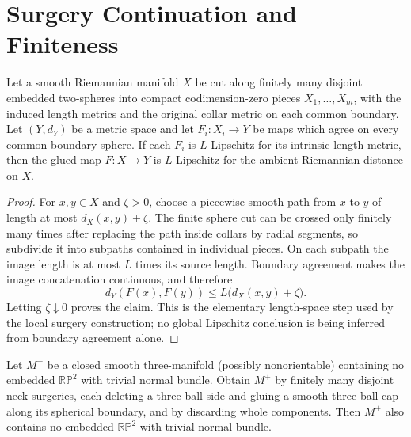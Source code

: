 \section{Surgery Continuation and Finiteness}

\begin{lemma}
\label{lem:length-metric-gluing}
\notready
Let a smooth Riemannian manifold $X$ be cut along finitely many disjoint
embedded two-spheres into compact codimension-zero pieces $X_1,\ldots,X_m$,
with the induced length metrics and the original collar metric on each common
boundary.  Let $(Y,d_Y)$ be a metric space and let
$F_i\colon X_i\to Y$ be maps which agree on every common boundary sphere.
If each $F_i$ is $L$-Lipschitz for its intrinsic length metric, then the
glued map $F\colon X\to Y$ is $L$-Lipschitz for the ambient Riemannian
distance on $X$.
\end{lemma}

\begin{proof}
For $x,y\in X$ and $\zeta>0$, choose a piecewise smooth path from $x$ to
$y$ of length at most $d_X(x,y)+\zeta$.  The finite sphere cut can be
crossed only finitely many times after replacing the path inside collars by
radial segments, so subdivide it into subpaths contained in individual
pieces.  On each subpath the image length is at most $L$ times its source
length.  Boundary agreement makes the image concatenation continuous, and
therefore
\[
 d_Y(F(x),F(y))\le L\bigl(d_X(x,y)+\zeta\bigr).
\]
Letting $\zeta\downarrow0$ proves the claim.  This is the elementary
length-space step used by the local surgery construction; no global
Lipschitz conclusion is being inferred from boundary agreement alone.
\end{proof}

\begin{lemma}
\label{lem:rp2-exclusion-under-ball-surgery}
\notready
Let $M^-$ be a closed smooth three-manifold (possibly nonorientable)
containing no embedded $\mathbb{RP}^2$ with trivial normal bundle.  Obtain
$M^+$ by finitely many
disjoint neck surgeries, each deleting a three-ball side and gluing a smooth
three-ball cap along its spherical boundary, and by discarding whole
components.  Then $M^+$ also contains no embedded $\mathbb{RP}^2$ with trivial
normal bundle.
\end{lemma}

